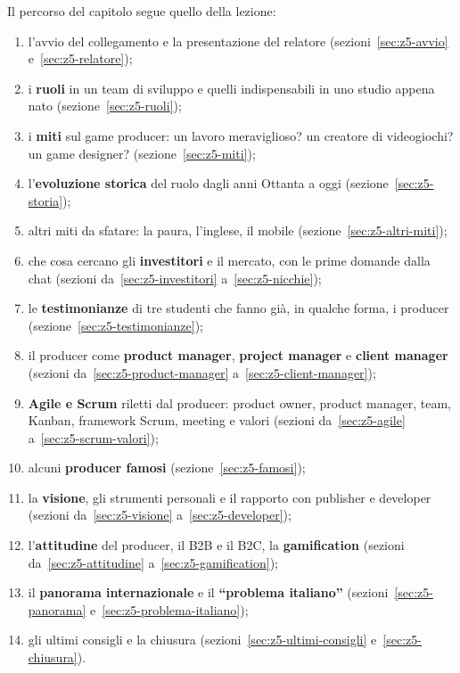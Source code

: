 Il percorso del capitolo segue quello della lezione:
\begin{enumerate}
  \item l'avvio del collegamento e la presentazione del relatore
        (sezioni~\ref{sec:z5-avvio} e~\ref{sec:z5-relatore});
  \item i \textbf{ruoli} in un team di sviluppo e quelli indispensabili in uno
        studio appena nato (sezione~\ref{sec:z5-ruoli});
  \item i \textbf{miti} sul game producer: un lavoro meraviglioso? un creatore
        di videogiochi? un game designer? (sezione~\ref{sec:z5-miti});
  \item l'\textbf{evoluzione storica} del ruolo dagli anni Ottanta a oggi
        (sezione~\ref{sec:z5-storia});
  \item altri miti da sfatare: la paura, l'inglese, il mobile
        (sezione~\ref{sec:z5-altri-miti});
  \item che cosa cercano gli \textbf{investitori} e il mercato, con le prime
        domande dalla chat (sezioni da~\ref{sec:z5-investitori}
        a~\ref{sec:z5-nicchie});
  \item le \textbf{testimonianze} di tre studenti che fanno già, in qualche
        forma, i producer (sezione~\ref{sec:z5-testimonianze});
  \item il producer come \textbf{product manager}, \textbf{project manager} e
        \textbf{client manager} (sezioni da~\ref{sec:z5-product-manager}
        a~\ref{sec:z5-client-manager});
  \item \textbf{Agile e Scrum} riletti dal producer: product owner, product
        manager, team, Kanban, framework Scrum, meeting e valori (sezioni
        da~\ref{sec:z5-agile} a~\ref{sec:z5-scrum-valori});
  \item alcuni \textbf{producer famosi} (sezione~\ref{sec:z5-famosi});
  \item la \textbf{visione}, gli strumenti personali e il rapporto con
        publisher e developer (sezioni da~\ref{sec:z5-visione}
        a~\ref{sec:z5-developer});
  \item l'\textbf{attitudine} del producer, il B2B e il B2C, la
        \textbf{gamification} (sezioni da~\ref{sec:z5-attitudine}
        a~\ref{sec:z5-gamification});
  \item il \textbf{panorama internazionale} e il \textbf{``problema
        italiano''} (sezioni~\ref{sec:z5-panorama} e~\ref{sec:z5-problema-italiano});
  \item gli ultimi consigli e la chiusura (sezioni~\ref{sec:z5-ultimi-consigli}
        e~\ref{sec:z5-chiusura}).
\end{enumerate}

